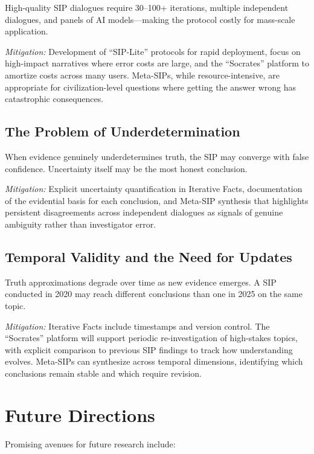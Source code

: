 \documentclass[11pt,a4paper]{article}
\begin{document}
High-quality SIP dialogues require 30--100+ iterations, multiple independent dialogues, and panels of AI models---making the protocol costly for mass-scale application.

\textit{Mitigation:} Development of ``SIP-Lite'' protocols for rapid deployment, focus on high-impact narratives where error costs are large, and the ``Socrates'' platform to amortize costs across many users. Meta-SIPs, while resource-intensive, are appropriate for civilization-level questions where getting the answer wrong has catastrophic consequences.

\subsection{The Problem of Underdetermination}

When evidence genuinely underdetermines truth, the SIP may converge with false confidence. Uncertainty itself may be the most honest conclusion.

\textit{Mitigation:} Explicit uncertainty quantification in Iterative Facts, documentation of the evidential basis for each conclusion, and Meta-SIP synthesis that highlights persistent disagreements across independent dialogues as signals of genuine ambiguity rather than investigator error.

\subsection{Temporal Validity and the Need for Updates}

Truth approximations degrade over time as new evidence emerges. A SIP conducted in 2020 may reach different conclusions than one in 2025 on the same topic.

\textit{Mitigation:} Iterative Facts include timestamps and version control. The ``Socrates'' platform will support periodic re-investigation of high-stakes topics, with explicit comparison to previous SIP findings to track how understanding evolves. Meta-SIPs can synthesize across temporal dimensions, identifying which conclusions remain stable and which require revision.

\section{Future Directions}

Promising avenues for future research include:
\end{document}
